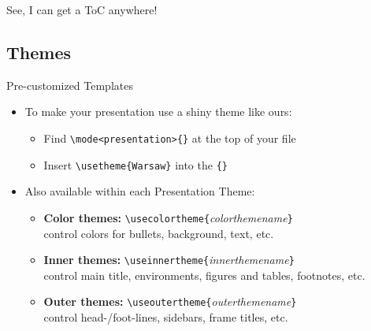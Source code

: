 \documentclass[pdf]{beamer}
\begin{document}
\begin{frame}{See, I can get a ToC anywhere!}
	\tableofcontents[currentsubsection]
\end{frame}

\subsection{Themes}

\begin{frame}[fragile]{Pre-customized Templates}
\begin{itemize}
\item To make your presentation use a shiny theme like ours:
	\begin{itemize}
	\item Find \verb=\mode<presentation>{}= at the top of your file
	\item Insert \verb=\usetheme{Warsaw}= into the \verb={}=
	\end{itemize}
\item Also available within each Presentation Theme:
	\begin{itemize}
	\item \textbf{Color themes:} \verb=\usecolortheme{=\emph{colorthemename}\verb=}= \\ 
	  control colors for bullets, background, text, etc.
	\item \textbf{Inner themes:} \verb=\useinnertheme{=\emph{innerthemename}\verb=}= \\ 
	  control main title, environments, figures and tables, footnotes, etc.
	\item \textbf{Outer themes:} \verb=\useoutertheme{=\emph{outerthemename}\verb=}= \\ 
	  control head-/foot-lines, sidebars, frame titles, etc.
	\end{itemize}
\end{itemize}
\end{frame}
\end{document}
